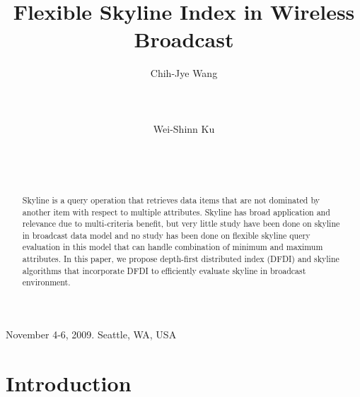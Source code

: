 \documentclass{sig-alternate}
\begin{document}
\title{Flexible Skyline Index in Wireless Broadcast}



\author
{
	\alignauthor Chih-Jye Wang\\
	\\
	\\
	\\
	\alignauthor Wei-Shinn Ku\\
	\\
	\\
	\\
}


 {November 4-6, 2009. Seattle, WA, USA}
 


\maketitle

\begin{abstract}
Skyline is a query operation that retrieves data items that are not
dominated by another item with respect to multiple attributes.
Skyline has broad application and relevance due to multi-criteria benefit,
but very little study have been done on skyline in broadcast data model
and no study has been done on flexible skyline query evaluation in this
model that can handle combination of minimum and maximum attributes.
In this paper, we propose depth-first distributed index (DFDI) and
skyline algorithms that incorporate DFDI to efficiently evaluate
skyline in broadcast environment.
\end{abstract}




%
%
%
%

\section{Introduction}\label{sec-intro}
\end{document}
